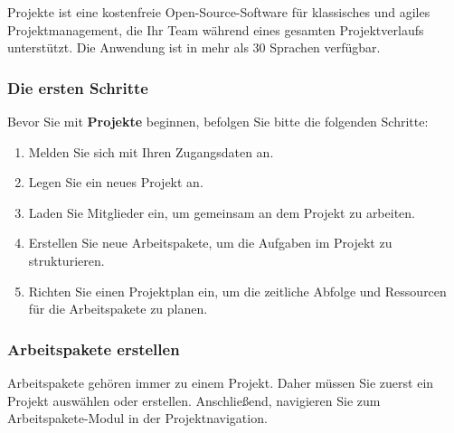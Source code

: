 \documentclass[
  letterpaper,
  DIV=11,
  numbers=noendperiod]{scrreprt}
\providecommand{\tightlist}{%
  \setlength{\itemsep}{0pt}\setlength{\parskip}{0pt}}\usepackage{longtable,booktabs,array}
\begin{document}
Projekte ist eine kostenfreie Open-Source-Software für klassisches und
agiles Projektmanagement, die Ihr Team während eines gesamten
Projektverlaufs unterstützt. Die Anwendung ist in mehr als 30 Sprachen
verfügbar.

\subsubsection{Die ersten Schritte}\label{die-ersten-schritte}

Bevor Sie mit \textbf{Projekte} beginnen, befolgen Sie bitte die
folgenden Schritte:

\begin{enumerate}
\def\labelenumi{\arabic{enumi}.}
\tightlist
\item
  Melden Sie sich mit Ihren Zugangsdaten an.
\item
  Legen Sie ein neues Projekt an.
\item
  Laden Sie Mitglieder ein, um gemeinsam an dem Projekt zu arbeiten.
\item
  Erstellen Sie neue Arbeitspakete, um die Aufgaben im Projekt zu
  strukturieren.
\item
  Richten Sie einen Projektplan ein, um die zeitliche Abfolge und
  Ressourcen für die Arbeitspakete zu planen.
\end{enumerate}

\subsubsection{Arbeitspakete erstellen}\label{arbeitspakete-erstellen}

Arbeitspakete gehören immer zu einem Projekt. Daher müssen Sie zuerst
ein Projekt auswählen oder erstellen. Anschließend, navigieren Sie zum
Arbeitspakete-Modul in der Projektnavigation.
\end{document}
